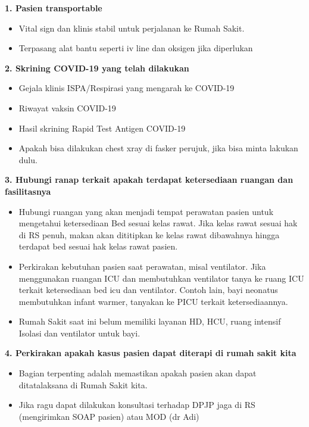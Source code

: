 \documentclass[
]{book}
\providecommand{\tightlist}{%
  \setlength{\itemsep}{0pt}\setlength{\parskip}{0pt}}
\begin{document}
\textbf{1. Pasien transportable}

\begin{itemize}
\tightlist
\item
  Vital sign dan klinis stabil untuk perjalanan ke Rumah Sakit.
\item
  Terpasang alat bantu seperti iv line dan oksigen jika diperlukan
\end{itemize}

\textbf{2. Skrining COVID-19 yang telah dilakukan}

\begin{itemize}
\tightlist
\item
  Gejala klinis ISPA/Respirasi yang mengarah ke COVID-19
\item
  Riwayat vaksin COVID-19
\item
  Hasil skrining Rapid Test Antigen COVID-19
\item
  Apakah bisa dilakukan chest xray di fasker perujuk, jika bisa minta lakukan dulu.
\end{itemize}

\textbf{3. Hubungi ranap terkait apakah terdapat ketersediaan ruangan dan fasilitasnya}

\begin{itemize}
\tightlist
\item
  Hubungi ruangan yang akan menjadi tempat perawatan pasien untuk mengetahui ketersediaan Bed sesuai kelas rawat. Jika kelas rawat sesuai hak di RS penuh, makan akan dititipkan ke kelas rawat dibawahnya hingga terdapat bed sesuai hak kelas rawat pasien.
\item
  Perkirakan kebutuhan pasien saat perawatan, misal ventilator. Jika menggunakan ruangan ICU dan membutuhkan ventilator tanya ke ruang ICU terkait ketersediaan bed icu dan ventilator. Contoh lain, bayi neonatus membutuhkan infant warmer, tanyakan ke PICU terkait ketersediaannya.
\item
  Rumah Sakit saat ini belum memiliki layanan HD, HCU, ruang intensif Isolasi dan ventilator untuk bayi.
\end{itemize}

\textbf{4. Perkirakan apakah kasus pasien dapat diterapi di rumah sakit kita}

\begin{itemize}
\tightlist
\item
  Bagian terpenting adalah memastikan apakah pasien akan dapat ditatalaksana di Rumah Sakit kita.
\item
  Jika ragu dapat dilakukan konsultasi terhadap DPJP jaga di RS (mengirimkan SOAP pasien) atau MOD (dr Adi)
\end{itemize}
\end{document}
